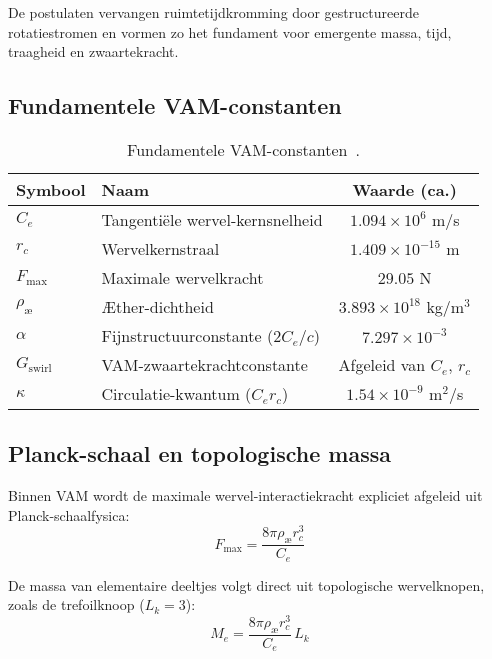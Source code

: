 De postulaten vervangen ruimtetijdkromming door gestructureerde rotatiestromen en vormen zo het fundament voor emergente massa, tijd, traagheid en zwaartekracht.

\subsection*{Fundamentele VAM-constanten}

\begin{table}[htbp]
    \centering
    \begin{tabular}{llc}
        \hline
        \toprule
        \textbf{Symbool} & \textbf{Naam} & \textbf{Waarde (ca.)} \\
        \hline
        \midrule
        $C_e$ & Tangentiële wervel-kernsnelheid & $1.094 \times 10^6$ m/s \\
        $r_c$ & Wervelkernstraal & $1.409 \times 10^{-15}$ m \\
        $F_{\text{max}}$ & Maximale wervelkracht & $29.05$ N \\
        $\rho_\text{\ae}$ & Æther-dichtheid & $3.893 \times 10^{18}$ kg/m$^3$ \\
        $\alpha$ & Fijnstructuurconstante ($2 C_e/c$) & $7.297 \times 10^{-3}$\\
        $G_{\text{swirl}}$ & VAM-zwaartekrachtconstante & Afgeleid van $C_e$, $r_c$\\
        $\kappa$ & Circulatie-kwantum ($C_e r_c$) & $1.54 \times 10^{-9}$ m$^2$/s \\
        \hline
        \bottomrule
    \end{tabular}
    \caption{Fundamentele VAM-constanten~\cite{vam2025field}.}
    \label{tab:constants}
\end{table}

\subsection*{Planck-schaal en topologische massa}

Binnen VAM wordt de maximale wervel-interactiekracht expliciet afgeleid uit Planck-schaalfysica:
\begin{equation}
    F_{\text{max}} = \frac{8\pi \rho_\text{\ae} r_c^3}{C_e}
\end{equation}


De massa van elementaire deeltjes volgt direct uit topologische wervelknopen, zoals de trefoilknoop ($L_k=3$):
\begin{equation}
    M_e = \frac{8\pi \rho_\text{\ae} r_c^3}{C_e}\, L_k
\end{equation}



